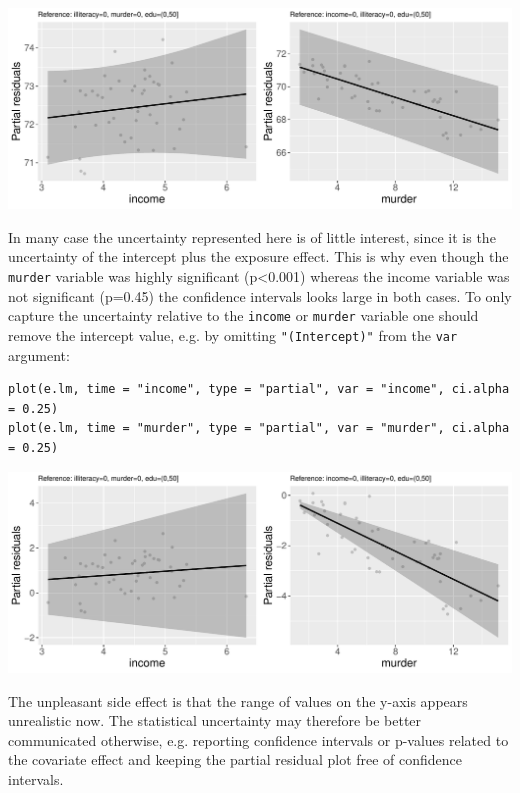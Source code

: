 \documentclass[12pt]{article}
\begin{document}
\begin{center}
\includegraphics[trim={0 0 0 0},width=1\textwidth]{./figures/gg-lmpres-cifit.pdf}
\end{center}

In many case the uncertainty represented here is of little interest,
since it is the uncertainty of the intercept plus the exposure
effect. This is why even though the \texttt{murder} variable was highly
significant (p<0.001) whereas the income variable was not significant
(p=0.45) the confidence intervals looks large in both cases. To only
capture the uncertainty relative to the \texttt{income} or \texttt{murder} variable
one should remove the intercept value, e.g. by omitting
\texttt{"(Intercept)"} from the \texttt{var} argument:
\lstset{language=r,label= ,caption= ,captionpos=b,numbers=none}
\begin{lstlisting}
plot(e.lm, time = "income", type = "partial", var = "income", ci.alpha = 0.25)
plot(e.lm, time = "murder", type = "partial", var = "murder", ci.alpha = 0.25)
\end{lstlisting}
\begin{center}
\includegraphics[trim={0 0 0 0},width=1\textwidth]{./figures/gg-lmpres-cicov.pdf}
\end{center}

The unpleasant side effect is that the range of values on the y-axis
appears unrealistic now. The statistical uncertainty may therefore be
better communicated otherwise, e.g. reporting confidence intervals or
p-values related to the covariate effect and keeping the partial
residual plot free of confidence intervals.
\end{document}
